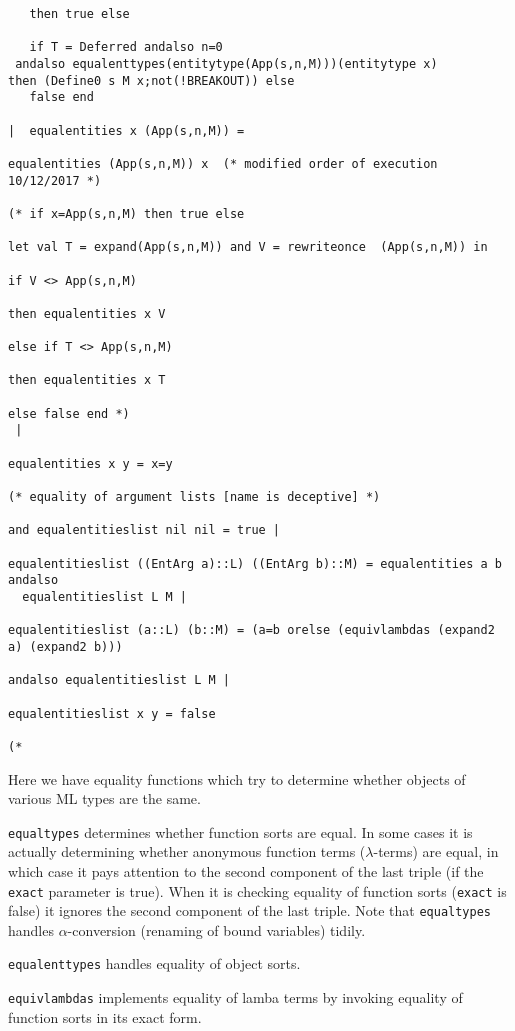 \documentclass{article}
\begin{document}
\begin{verbatim}
   then true else 
   
   if T = Deferred andalso n=0
 andalso equalenttypes(entitytype(App(s,n,M)))(entitytype x) 
then (Define0 s M x;not(!BREAKOUT)) else
   false end

|  equalentities x (App(s,n,M)) =

equalentities (App(s,n,M)) x  (* modified order of execution 10/12/2017 *)

(* if x=App(s,n,M) then true else

let val T = expand(App(s,n,M)) and V = rewriteonce  (App(s,n,M)) in 

if V <> App(s,n,M)

then equalentities x V

else if T <> App(s,n,M)

then equalentities x T

else false end *)
 |

equalentities x y = x=y

(* equality of argument lists [name is deceptive] *)

and equalentitieslist nil nil = true |

equalentitieslist ((EntArg a)::L) ((EntArg b)::M) = equalentities a b andalso
  equalentitieslist L M |

equalentitieslist (a::L) (b::M) = (a=b orelse (equivlambdas (expand2 a) (expand2 b)))

andalso equalentitieslist L M |

equalentitieslist x y = false

(*

\end{verbatim}

Here we have equality functions which try to determine whether objects of various ML types are the same.

{\tt equaltypes} determines whether function sorts are equal.  In some cases it is actually determining whether anonymous function terms ($\lambda$-terms) are equal, in which case it pays attention to the second component of the last triple (if the {\tt exact} parameter is true).  When it is checking equality of function sorts ({\tt exact} is false) it ignores the second component of the last triple.  Note that {\tt equaltypes} handles $\alpha$-conversion (renaming of bound variables) tidily.

{\tt equalenttypes} handles equality of object sorts.

{\tt equivlambdas} implements equality of lamba terms by invoking equality of function sorts in its exact form.
\end{document}
